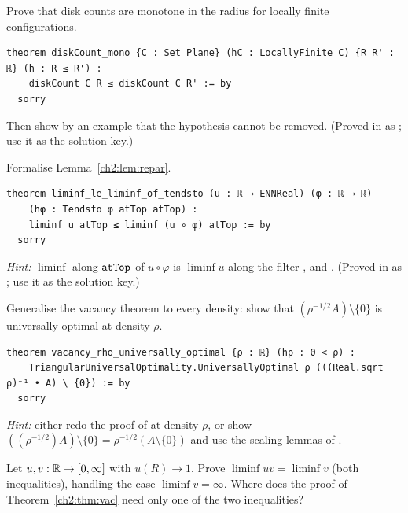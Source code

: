 \begin{exercise}[Lean]\label{ch2:ex:mono}
Prove that disk counts are monotone in the radius for locally finite configurations.
\begin{lstlisting}[language=Lean]
theorem diskCount_mono {C : Set Plane} (hC : LocallyFinite C) {R R' : ℝ} (h : R ≤ R') :
    diskCount C R ≤ diskCount C R' := by
  sorry
\end{lstlisting}
Then show by an example that the hypothesis  cannot be removed. (Proved in  as
; use it as the solution key.)
\end{exercise}

\begin{exercise}[Lean]\label{ch2:ex:repar}
Formalise Lemma~\ref{ch2:lem:repar}.
\begin{lstlisting}[language=Lean]
theorem liminf_le_liminf_of_tendsto (u : ℝ → ENNReal) (φ : ℝ → ℝ)
    (hφ : Tendsto φ atTop atTop) :
    liminf u atTop ≤ liminf (u ∘ φ) atTop := by
  sorry
\end{lstlisting}
\emph{Hint:} $\liminf$ along $\lean{atTop}$ of $u\circ\varphi$ is $\liminf u$ along the filter , and
. (Proved in  as ; use it as the solution
key.)
\end{exercise}

\begin{exercise}[Lean]\label{ch2:ex:vacrho}
Generalise the vacancy theorem to every density: show that $(\rho^{-1/2}A)\setminus\{0\}$ is universally optimal at
density $\rho$.
\begin{lstlisting}[language=Lean]
theorem vacancy_rho_universally_optimal {ρ : ℝ} (hρ : 0 < ρ) :
    TriangularUniversalOptimality.UniversallyOptimal ρ (((Real.sqrt ρ)⁻¹ • A) \ {0}) := by
  sorry
\end{lstlisting}
\emph{Hint:} either redo the proof of  at density $\rho$, or show
$((\rho^{-1/2})A)\setminus\{0\}=\rho^{-1/2}(A\setminus\{0\})$ and use the scaling lemmas of .
\end{exercise}

\begin{exercise}\label{ch2:ex:liminfmul}
Let $u,v:\mathbb{R}\to[0,\infty]$ with $u(R)\to1$. Prove $\liminf uv=\liminf v$ (both inequalities), handling the case
$\liminf v=\infty$. Where does the proof of Theorem~\ref{ch2:thm:vac} need only one of the two inequalities?
\end{exercise}

